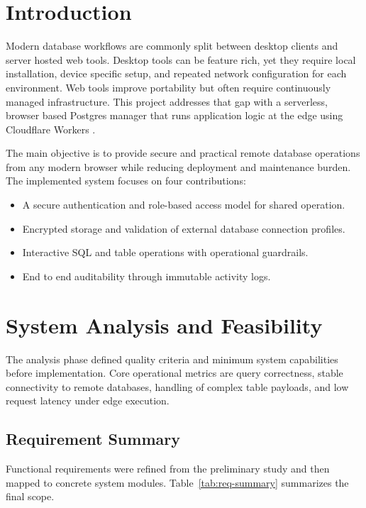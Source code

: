 \documentclass[conference]{IEEEtran}
\begin{document}
\section{Introduction}
Modern database workflows are commonly split between desktop clients and server hosted web tools. Desktop tools can be feature rich, yet they require local installation, device specific setup, and repeated network configuration for each environment. Web tools improve portability but often require continuously managed infrastructure. This project addresses that gap with a serverless, browser based Postgres manager that runs application logic at the edge using Cloudflare Workers \cite{cloudflare-workers}.

The main objective is to provide secure and practical remote database operations from any modern browser while reducing deployment and maintenance burden. The implemented system focuses on four contributions:
\begin{itemize}
\item A secure authentication and role-based access model for shared operation.
\item Encrypted storage and validation of external database connection profiles.
\item Interactive SQL and table operations with operational guardrails.
\item End to end auditability through immutable activity logs.
\end{itemize}

\section{System Analysis and Feasibility}

The analysis phase defined quality criteria and minimum system capabilities before implementation. Core operational metrics are query correctness, stable connectivity to remote databases, handling of complex table payloads, and low request latency under edge execution.

\subsection{Requirement Summary}

Functional requirements were refined from the preliminary study and then mapped to concrete system modules. Table~\ref{tab:req-summary} summarizes the final scope.
\end{document}
